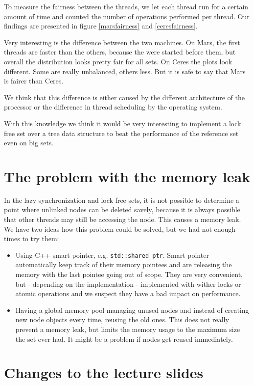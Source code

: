 To measure the fairness between the threads, we let each thread run for a certain amount of time and counted the number of operations performed per thread. Our findings are presented in figure \ref{marsfairness} and \ref{ceresfairness}.

Very interesting is the difference between the two machines. On Mars, the first threads are faster than the others, because the were started before them, but overall the distribution looks pretty fair for all sets. On Ceres the plots look different. Some are really unbalanced, others less. But it is safe to say that Mars is fairer than Ceres.

We think that this difference is either caused by the different architecture of the processor or the difference in thread scheduling by the operating system.

With this knowledge we think it would be very interesting to implement a lock free set over a tree data structure to beat the performance of the reference set even on big sets.

\section{The problem with the memory leak}
\label{memoryleak}
In the lazy synchronization and lock free sets, it is not possible to determine a point where unlinked nodes can be deleted savely, because it is always possible that other threads may still be accessing the node. This causes a memory leak. We have two ideas how this problem could be solved, but we had not enough times to try them:
\begin{itemize}
  \item Using C++ smart pointer, e.g. \texttt{std::shared\_ptr}. Smart pointer automatically keep track of their memory pointees and are releasing the memory with the last pointee going out of scope. They are very convenient, but - depending on the implementation - implemented with wither locks or atomic operations and we suspect they have a bad impact on performance.
  \item Having a global memory pool managing unused nodes and instead of creating new node objects every time, reusing the old ones. This does not really prevent a memory leak, but limits the memory usage to the maximum size the set ever had. It might be a problem if nodes get reused immediately.
\end{itemize}


\section{Changes to the lecture slides} \label{mistakes}


